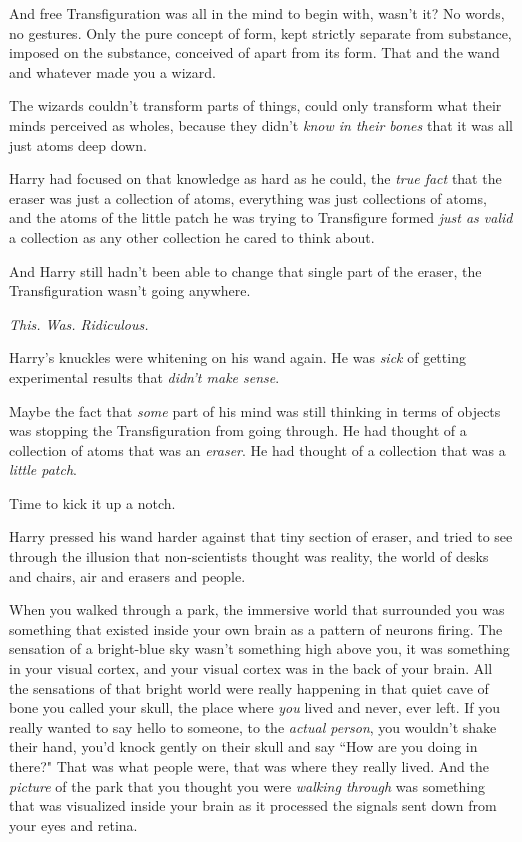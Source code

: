 And free Transfiguration was all in the mind to begin with, wasn't it? No words, no gestures. Only the pure concept of form, kept strictly separate from substance, imposed on the substance, conceived of apart from its form. That and the wand and whatever made you a wizard.

The wizards couldn't transform parts of things, could only transform what their minds perceived as wholes, because they didn't \emph{know in their bones} that it was all just atoms deep down.

Harry had focused on that knowledge as hard as he could, the \emph{true fact} that the eraser was just a collection of atoms, everything was just collections of atoms, and the atoms of the little patch he was trying to Transfigure formed \emph{just as valid} a collection as any other collection he cared to think about.

And Harry still hadn't been able to change that single part of the eraser, the Transfiguration wasn't going anywhere.

\emph{This. Was. Ridiculous.}

Harry's knuckles were whitening on his wand again. He was \emph{sick} of getting experimental results that \emph{didn't make sense}.

Maybe the fact that \emph{some} part of his mind was still thinking in terms of objects was stopping the Transfiguration from going through. He had thought of a collection of atoms that was an \emph{eraser}. He had thought of a collection that was a \emph{little patch}.

Time to kick it up a notch.

Harry pressed his wand harder against that tiny section of eraser, and tried to see through the illusion that non-scientists thought was reality, the world of desks and chairs, air and erasers and people.

When you walked through a park, the immersive world that surrounded you was something that existed inside your own brain as a pattern of neurons firing. The sensation of a bright-blue sky wasn't something high above you, it was something in your visual cortex, and your visual cortex was in the back of your brain. All the sensations of that bright world were really happening in that quiet cave of bone you called your skull, the place where \emph{you} lived and never, ever left. If you really wanted to say hello to someone, to the \emph{actual person}, you wouldn't shake their hand, you'd knock gently on their skull and say ``How are you doing in there?" That was what people were, that was where they really lived. And the \emph{picture} of the park that you thought you were \emph{walking through} was something that was visualized inside your brain as it processed the signals sent down from your eyes and retina.

